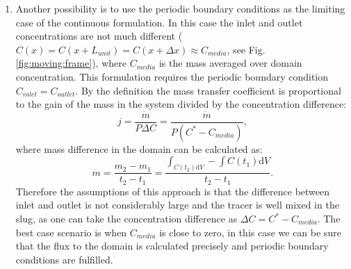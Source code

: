 \documentclass{article}
\newcommand{\beq}{\begin{equation}}
\newcommand{\feq}{\end{equation}}
\begin{document}
\begin{enumerate}
\item Another possibility is to use the periodic boundary conditions as the limiting case of the
continuous formulation. In this case the inlet and outlet concentrations are not much different
($C(x)=C(x+L_{unit})=C(x+\Delta x)\approx C_{media}$, see Fig. \ref{fig:moving:frame}), where
$C_{media}$ is the mass averaged over domain concentration. This formulation requires the periodic
boundary condition $C_{inlet}=C_{outlet}$. By the definition the mass transfer coefficient is
proportional to the gain of the mass in the system divided by the concentration difference:
\beq
j=\frac{\dot{m}}{P \Delta C}=\frac{\dot{m}}{P (C^{*}-C_{media})},
\feq
where mass difference in the domain can be calculated as:
\beq
\dot{m}=\frac{m_2-m_1}{t_2-t_1}=\frac{\int_{C(t_2)\mathrm{d}V}-\int{C(t_1)\mathrm{d}V}}{t_2-t_1}.
\feq
Therefore the assumptions  of this approach is that the difference between inlet and outlet is not
considerably large and the tracer is well mixed in the slug, as one can take the concentration
difference as $\Delta C = C^{*}-C_{media}$. The best case scenario is when $C_{media}$ is close to
zero, in this case we can be sure that the flux to the domain is calculated precisely and periodic
boundary conditions are fulfilled.
\end{enumerate}
 
\end{document}
